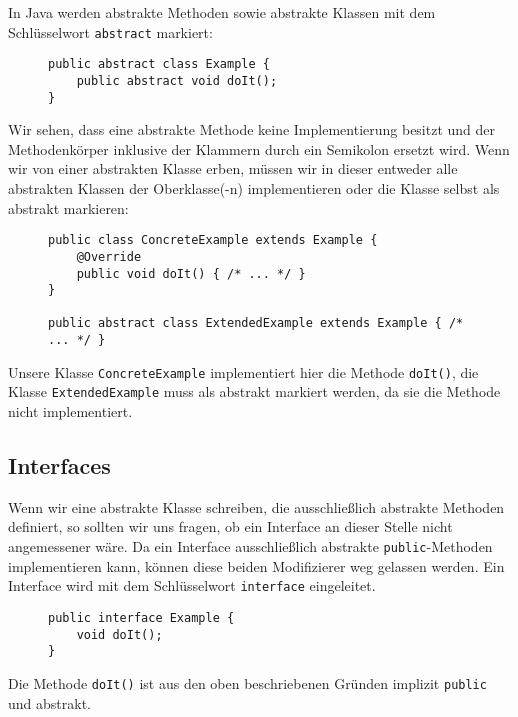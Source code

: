 	In Java werden abstrakte Methoden sowie abstrakte Klassen mit dem Schlüsselwort \lstinline|abstract| markiert:
	\begin{figure}[H]
		\centering
		\begin{lstlisting}
public abstract class Example {
	public abstract void doIt();
}
\end{lstlisting}
	\end{figure}
	Wir sehen, dass eine abstrakte Methode keine Implementierung besitzt und der Methodenkörper inklusive der Klammern durch ein Semikolon ersetzt wird. Wenn wir von einer abstrakten Klasse erben, müssen wir in dieser entweder alle abstrakten Klassen der Oberklasse(-n) implementieren oder die Klasse selbst als abstrakt markieren:
	\begin{figure}[H]
		\centering
		\begin{lstlisting}
public class ConcreteExample extends Example {
	@Override
	public void doIt() { /* ... */ }
}

public abstract class ExtendedExample extends Example { /* ... */ }
\end{lstlisting}
	\end{figure}
	Unsere Klasse \lstinline|ConcreteExample| implementiert hier die Methode \lstinline|doIt()|, die Klasse \lstinline|ExtendedExample| muss als abstrakt markiert werden, da sie die Methode nicht implementiert.

\subsection{Interfaces}
	
	Wenn wir eine abstrakte Klasse schreiben, die ausschließlich abstrakte Methoden definiert, so sollten wir uns fragen, ob ein Interface an dieser Stelle nicht angemessener wäre. Da ein Interface ausschließlich abstrakte \lstinline|public|-Methoden implementieren kann, können diese beiden Modifizierer weg gelassen werden. Ein Interface wird mit dem Schlüsselwort \lstinline|interface| eingeleitet.
	\begin{figure}[H]
		\centering
		\begin{lstlisting}
public interface Example {
	void doIt();
}
\end{lstlisting}
	\end{figure}
	Die Methode \lstinline|doIt()| ist aus den oben beschriebenen Gründen implizit \lstinline|public| und abstrakt.
	
